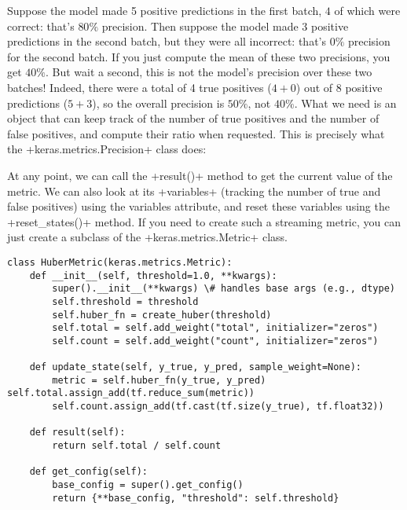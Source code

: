 Suppose the model made 5 positive predictions in the first batch, $4$ of which were correct: that's $80\%$ precision. Then suppose the model made $3$ positive predictions in the second batch, but they were all incorrect: that's $0\%$ precision for the second batch. If you just compute the mean of these two precisions, you get $40\%$. But wait a second, this is not the model's precision over these two batches! Indeed, there were a total of 4 true positives ($4 + 0$) out of $8$ positive predictions ($5 + 3$), so the overall precision is $50\%$, not $40\%$. What we need is an object that can keep track of the number of true positives and the number of false positives, and compute their ratio when requested. This is precisely what the \cd+keras.metrics.Precision+ class does:

At any point, we can call the \cd+result()+ method to get the current value of the metric. We can also look at its \cd+variables+ (tracking the number of true and false positives) using the variables attribute, and reset these variables using the \cd+reset_states()+ method. If you need to create such a streaming metric, you can just create a subclass of the \cd+keras.metrics.Metric+ class. 

\begin{lstlisting}
class HuberMetric(keras.metrics.Metric):
	def __init__(self, threshold=1.0, **kwargs):
		super().__init__(**kwargs) \# handles base args (e.g., dtype) 
		self.threshold = threshold
		self.huber_fn = create_huber(threshold)
		self.total = self.add_weight("total", initializer="zeros") 
		self.count = self.add_weight("count", initializer="zeros")

	def update_state(self, y_true, y_pred, sample_weight=None): 
		metric = self.huber_fn(y_true, y_pred) self.total.assign_add(tf.reduce_sum(metric)) 	
		self.count.assign_add(tf.cast(tf.size(y_true), tf.float32))
	
	def result(self):
		return self.total / self.count

	def get_config(self):
		base_config = super().get_config()
		return {**base_config, "threshold": self.threshold}
\end{lstlisting}

